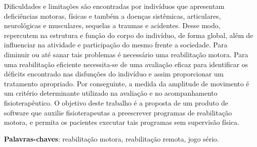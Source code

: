 \begin{resumo}

Dificuldades e limitações são encontradas por indivíduos que apresentam deficiências
 motoras, físicas e também a doenças sistêmicas, articulares, neurológicas e musculares,
 sequelas a traumas e acidentes. Desse modo, repercutem na estrutura e função do corpo
 do indivíduo, de forma global, além de influenciar na atividade e participação do
 mesmo frente a sociedade. Para diminuir ou até sanar tais problemas é necessário uma
 reabilitação motora. Para uma reabilitação eficiente necessita-se de uma avaliação
 eficaz para identificar os déficits encontrado nas disfunções do indivíduo e assim
proporcionar um tratamento apropriado. Por conseguinte, a medida da amplitude de
 movimento é um critério determinante utilizado na avaliação e no acompanhamento
 fisioterapêutico. O objetivo deste trabalho é a proposta de um produto de software
 que auxilie fisioterapeutas a preescrever programas de reabilitação motora,
  e permita os pacientes executar tais programas sem supervisão física.
 \vspace{\onelineskip}

 \noindent
 \textbf{Palavras-chaves}: reabilitação motora, reabilitação remota, jogo sério.
\end{resumo}
